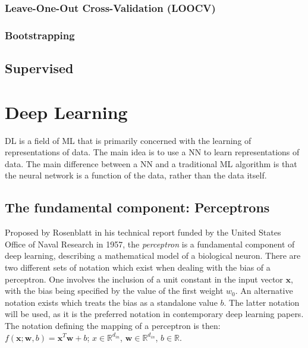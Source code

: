 \subsubsection{Leave-One-Out Cross-Validation (LOOCV)}

\subsubsection{Bootstrapping}

\subsection{Supervised}


\section{Deep Learning\label{sec:DL}}
\Gls{DL} is a field of \gls{ML} that is primarily concerned with
the learning of representations of data. The main idea is to use a \gls{NN} to learn representations of data. The main difference between a
\gls{NN} and a traditional \gls{ML} algorithm is that the
neural network is a function of the data, rather than the data itself.

\subsection{The fundamental component: Perceptrons}

Proposed by Rosenblatt \cite{Rosenblatt_1957_6098} in his technical
report funded by the United States Office of Naval Research
\cite{doi:10.1177/030631296026003005} in 1957, the \textit{perceptron} is a
fundamental component of deep learning, describing a mathematical model of a
biological neuron. There are two different sets of notation which exist when
dealing with the bias of a perceptron. One involves the inclusion of a unit
constant in the input vector $\mathbf{x}$, with the bias being specified by the
value of the first weight $w_0$. An alternative notation exists which treats the
bias as a standalone value $b$. The latter notation will be used, as it is the
preferred notation in contemporary deep learning papers. The notation defining
the mapping of a perceptron is then: $f(\mathbf{x};\mathbf{w},
b)=\mathbf{x}^T\mathbf{w}+b$; $x\in\mathbb{R}^{d_{in}}$,
$\mathbf{w}\in\mathbb{R}^{d_{in}}$, $b\in\mathbb{R}$.

